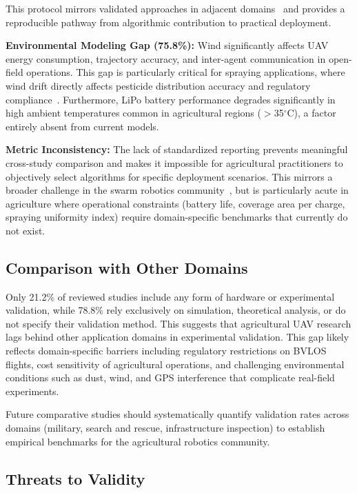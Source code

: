 \documentclass[review, 12pt, times]{elsarticle}
\begin{document}
This protocol mirrors validated approaches in adjacent
domains~\cite{shafiq2022} and provides a reproducible
pathway from algorithmic contribution to practical
deployment.

\textbf{Environmental Modeling Gap (75.8\%):} Wind
significantly affects UAV energy consumption, trajectory
accuracy, and inter-agent communication in open-field
operations. This gap is particularly critical for spraying
applications, where wind drift directly affects pesticide
distribution accuracy and regulatory
compliance~\cite{liu2021}. Furthermore, LiPo battery
performance degrades significantly in high ambient
temperatures common in agricultural regions
($>$35$^\circ$C), a factor entirely absent from current
models.

\textbf{Metric Inconsistency:} The lack of standardized
reporting prevents meaningful cross-study comparison and
makes it impossible for agricultural practitioners to
objectively select algorithms for specific deployment
scenarios. This mirrors a broader challenge in the swarm
robotics community~\cite{puente2022,sharma2022}, but is
particularly acute in agriculture where operational
constraints (battery life, coverage area per charge,
spraying uniformity index) require domain-specific
benchmarks that currently do not exist.

\subsection{Comparison with Other Domains}

Only 21.2\% of reviewed studies include any form of
hardware or experimental validation, while 78.8\% rely
exclusively on simulation, theoretical analysis, or do
not specify their validation method. This suggests that
agricultural UAV research lags behind other application
domains in experimental validation. This gap likely
reflects domain-specific barriers including regulatory
restrictions on BVLOS flights, cost sensitivity of
agricultural operations, and challenging environmental
conditions such as dust, wind, and GPS interference that
complicate real-field experiments.

Future comparative studies should systematically quantify
validation rates across domains (military, search and
rescue, infrastructure inspection) to establish empirical
benchmarks for the agricultural robotics community.

\subsection{Threats to Validity}
\end{document}
